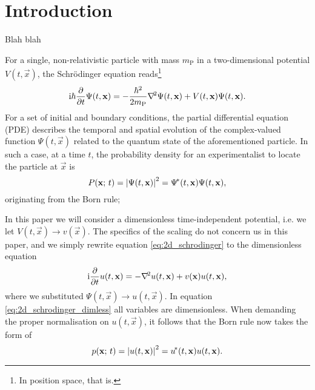 \section{Introduction}\label{sec:introduction}


Blah blah 



For a single, non-relativistic particle with mass $m_\mathrm{P}$ in a two-dimensional potential $V(t, \vec{x})$, the Schrödinger equation reads\footnote{In position space, that is. }
\begin{equation}\label{eq:2d_schrodinger}
    \mathrm{i} \hbar \pdv{}{t}\Psi(t, \mathbf{x}) = -\frac{\hbar^2}{2m_\mathrm{P}}\nabla^{\!2} \Psi(t, \mathbf{x})  + V(t, \mathbf{x}) \Psi(t, \mathbf{x}).
\end{equation}
For a set of initial and boundary conditions, the partial differential equation (PDE) describes the temporal and spatial evolution of the complex-valued function $\Psi(t, \vec{x})$ related to the quantum state of the aforementioned particle. In such a case, at a time $t$, the probability density for an experimentalist to locate the particle at $\vec{x}$  is 
\begin{equation}\label{2d_bornrule}
    P(\mathbf{x}; \, t) = \abs{\Psi(t, \mathbf{x})}^2 = \Psi^{\!*}(t, \mathbf{x}) \Psi(t, \mathbf{x}),
\end{equation} 
originating from the Born rule; 

In this paper we will consider a dimensionless time-independent potential, i.e. we let $V(t, \vec{x}) \to v(\vec{x})$. The specifics of the scaling do not concern us in this paper, and we simply rewrite equation \eqref{eq:2d_schrodinger} to the dimensionless equation
\begin{equation}\label{eq:2d_schrodinger_dimless}
    \mathrm{i} \pdv{}{t}u(t, \mathbf{x}) = - \nabla^{\!2}u(t, \mathbf{x})+ v(\mathbf{x})u(t, \mathbf{x}),
\end{equation}
where we substituted $\Psi(t, \vec{x}) \to u(t, \vec{x})$. In equation \eqref{eq:2d_schrodinger_dimless} all variables are dimensionless. When demanding the proper normalisation on $u(t,\vec{x})$, it follows that the Born rule now takes the form of
\begin{equation}\label{eq:2d_bornrule_dimless}
    p(\mathbf{x}; \, t) = \abs{u(t, \mathbf{x})}^2 = u^{\!*} (t, \mathbf{x})u(t, \mathbf{x}).
\end{equation}







